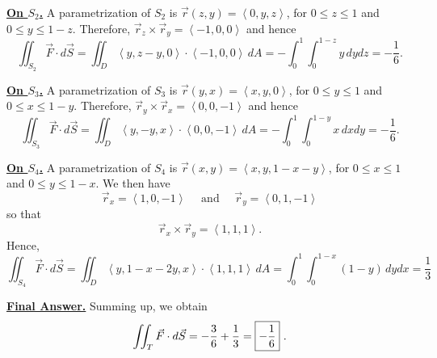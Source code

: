 \documentclass[12pt]{article}
\begin{document}
	\textbf{\underline{On $S_2$.}}
	A parametrization of $S_2$ is $\vec{r} (z, y) = \left\langle 0 , y , z \right\rangle$, for $0 \leq z \leq 1$ and $0 \leq y \leq 1 - z$. Therefore, $\vec{r}_z \times \vec{r}_y = \left\langle -1 , 0, 0 \right\rangle$ and hence
		\[
			\iint_{S_2} \vec{F} \cdot d\vec{S} = \iint_D \left\langle y , z - y , 0 \right\rangle \cdot \left\langle -1, 0, 0 \right\rangle \, dA = -\int_0^1 \int_0^{1 - z} y \, dy dz = -\frac{1}{6} . 
		\]

	\textbf{\underline{On $S_3$.}}
	A parametrization of $S_3$ is $\vec{r} (y, x) = \left\langle x, y, 0 \right\rangle$, for $0 \leq y \leq 1$ and $0 \leq x \leq 1 - y$. Therefore, $\vec{r}_y \times \vec{r}_x = \left\langle 0, 0, -1 \right\rangle$ and hence
		\[
			\iint_{S_3} \vec{F} \cdot d \vec{S} = \iint_D \left\langle y, -y , x \right\rangle \cdot \left\langle 0 , 0 , -1 \right\rangle \, dA = -\int_0^1 \int_0^{1 - y} x \, dx dy = -\frac{1}{6} .
		\]

	\textbf{\underline{On $S_4$.}}
	A parametrization of $S_4$ is $\vec{r} (x, y) = \left\langle x, y, 1 - x - y \right\rangle$, for $0 \leq x \leq 1$ and $0 \leq y \leq 1 - x$. We then have
		\[
			\vec{r}_x = \left\langle 1, 0, -1 \right\rangle \quad \text{ and } \quad \vec{r}_y = \left\langle 0, 1, -1 \right\rangle 
		\]
	so that
		\[
			\vec{r}_x \times \vec{r}_y = \left\langle 1, 1, 1 \right\rangle .
		\]
	Hence,
		\[
			\iint_{S_4} \vec{F} \cdot d \vec{S} = \iint_D \left\langle y , 1 - x - 2y , x \right\rangle \cdot \left\langle 1, 1, 1 \right\rangle \, dA = \int_0^1 \int_0^{1 - x} (1 - y) \, dy dx = \frac{1}{3} 
		\]

	\textbf{\underline{Final Answer.}}
	Summing up, we obtain
		\[
			\iint_T \vec{F} \cdot d \vec{S} = -\frac{3}{6} + \frac{1}{3} = \fbox{$-\displaystyle\frac{1}{6}$} \,\,.
		\]
\end{document}
